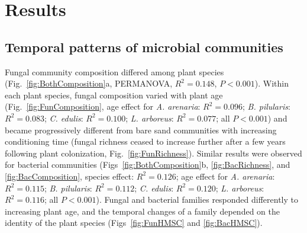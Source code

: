 


\section{Results}
\subsection*{Temporal patterns of microbial communities}
Fungal community composition differed among plant species (Fig.~\ref{fig:BothComposition}a, PERMANOVA, $R^{2}=0.148$, $P<0.001$). Within each plant species, fungal composition varied with plant age (Fig.~\ref{fig:FunComposition}, age effect for \textit{A. arenaria}: $R^{2}=0.096$; \textit{B. pilularis}: $R^{2}=0.083$; \textit{C. edulis}: $R^{2}=0.100$; \textit{L. arboreus}: $R^{2}=0.077$; all $P<0.001$) and became progressively different from bare sand communities with increasing conditioning time (fungal richness ceased to increase further after a few years following plant colonization, Fig.~\ref{fig:FunRichness}).
Similar results were observed for bacterial communities (Figs~\ref{fig:BothComposition}b, \ref{fig:BacRichness}, and \ref{fig:BacComposition}, species effect: $R^{2}=0.126$; age effect for \textit{A. arenaria}: $R^{2}=0.115$; \textit{B. pilularis}: $R^{2}=0.112$; \textit{C. edulis}: $R^{2}=0.120$; \textit{L. arboreus}: $R^{2}=0.116$; all $P<0.001$). 
Fungal and bacterial families responded differently to increasing plant age, and the temporal changes of a family depended on the identity of the plant species (Figs~\ref{fig:FunHMSC} and \ref{fig:BacHMSC}). 
\par



